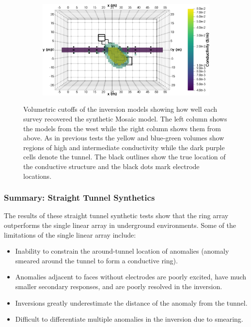 \documentclass[preprint,authoryear,12pt]{elsarticle}
\begin{document}
\begin{figure}[htp]{}
\begin{center}
\begin{subfigure}{0.53\linewidth}
      \end{subfigure}
      \hspace{-4.0cm}
      \qquad
      \begin{subfigure}{0.53\linewidth}
         \label{fig:SynthMosaic2_StraightTunnel_Ring_Top}
         \includegraphics[trim=0cm 0cm 0cm 0cm, clip=true,width=\linewidth]{./figures/Fig13f.png}
      \end{subfigure}
   \end{center}
\vspace{-0.4cm}
\caption{Volumetric cutoffs of the inversion models showing how well each survey recovered the synthetic Mosaic model. The left column shows the models from the west while the right column shows them from above. As in previous tests the yellow and blue-green volumes show regions of high and intermediate conductivity while the dark purple cells denote the tunnel. The black outlines show the true location of the conductive structure and the black dots mark electrode locations.}
\label{fig:StraightTunnel_SynthMosaic2_Isosurfaces}
\end{figure}



\subsubsection{Summary: Straight Tunnel Synthetics}
\label{sec:RingArray_Development_Straight_Synth_Summary}

The results of these straight tunnel synthetic tests show that the ring array outperforms the single linear array in underground environments. Some of the limitations of the single linear array include:
\begin{itemize}
   \item{Inability to constrain the around-tunnel location of anomalies (anomaly smeared around the tunnel to form a conductive ring).}
   \item{Anomalies adjacent to faces without electrodes are poorly excited, have much smaller secondary responses, and are poorly resolved in the inversion.}
   \item{Inversions greatly underestimate the distance of the anomaly from the tunnel.}
   \item{Difficult to differentiate multiple anomalies in the inversion due to smearing.}
\end{itemize}
\end{document}
